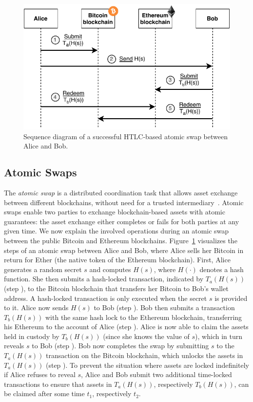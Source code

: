 \begin{figure}[t]
	\centering
	\includegraphics[width=.6\linewidth]{xchange/assets/atomic_swap}
	\caption{Sequence diagram of a successful HTLC-based atomic swap between Alice and Bob.}
	\label{fig:atomic_swap}
\end{figure}

\subsection{Atomic Swaps}
The \emph{atomic swap} is a distributed coordination task that allows asset exchange between different blockchains, without need for a trusted intermediary~\cite{herlihy2018atomic}.
Atomic swaps enable two parties to exchange blockchain-based assets with atomic guarantees: the asset exchange either completes or fails for both parties at any given time.
We now explain the involved operations during an atomic swap between the public Bitcoin and Ethereum blockchains.
Figure~\ref{fig:atomic_swap} visualizes the steps of an atomic swap between Alice and Bob, where Alice sells her Bitcoin in return for Ether (the native token of the Ethereum blockchain).
First, Alice generates a random secret $ s $ and computes $ H(s) $, where $ H(\cdot) $ denotes a hash function.
She then submits a hash-locked transaction, indicated by $ T_a(H(s)) $ (step ), to the Bitcoin blockchain that transfers her Bitcoin to Bob's wallet address.
A hash-locked transaction is only executed when the secret $ s $ is provided to it.
Alice now sends $ H(s) $ to Bob (step ).
Bob then submits a transaction $ T_b(H(s)) $ with the same hash lock to the Ethereum blockchain, transferring his Ethereum to the account of Alice (step ).
Alice is now able to claim the assets held in custody by $ T_b(H(s)) $ (since she knows the value of $ s $), which in turn reveals $ s $ to Bob (step ).
Bob now completes the swap by submitting $ s $ to the $ T_a(H(s)) $ transaction on the Bitcoin blockchain, which unlocks the assets in $ T_a(H(s)) $ (step ).
To prevent the situation where assets are locked indefinitely if Alice refuses to reveal $ s $, Alice and Bob submit two additional time-locked transactions to ensure that assets in $ T_a(H(s)) $, respectively $ T_b(H(s)) $, can be claimed after some time $ t_1 $, respectively $ t_2 $.
